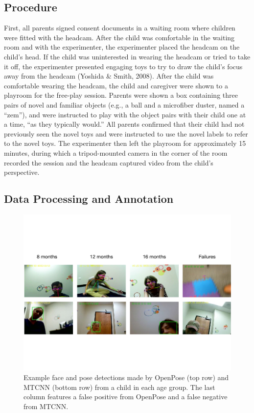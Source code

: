 \documentclass[10pt, letterpaper]{article}
\begin{document}
\subsection{Procedure}\label{procedure}

First, all parents signed consent documents in a waiting room where
children were fitted with the headcam. After the child was comfortable
in the waiting room and with the experimenter, the experimenter placed
the headcam on the child's head. If the child was uninterested in
wearing the headcam or tried to take it off, the experimenter presented
engaging toys to try to draw the child's focus away from the headcam
(Yoshida \& Smith, 2008). After the child was comfortable wearing the
headcam, the child and caregiver were shown to a playroom for the
free-play session. Parents were shown a box containing three pairs of
novel and familiar objects (e.g., a ball and a microfiber duster, named
a ``zem''), and were instructed to play with the object pairs with their
child one at a time, ``as they typically would.'' All parents confirmed
that their child had not previously seen the novel toys and were
instructed to use the novel labels to refer to the novel toys. The
experimenter then left the playroom for approximately 15 minutes, during
which a tripod-mounted camera in the corner of the room recorded the
session and the headcam captured video from the child's perspective.

\subsection{Data Processing and
Annotation}\label{data-processing-and-annotation}

\begin{figure}
\centering
\includegraphics[width=6in]{images/detector_samples_banner.pdf}
\caption{\label{fig:frames} Example face and pose detections made by OpenPose (top row) and MTCNN (bottom row) from a child in each age group. The last column features a false positive from OpenPose and a false negative from MTCNN.}
\end{figure}
\end{document}

